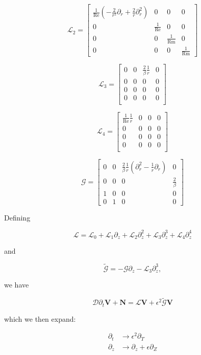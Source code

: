 \documentclass{paper}
\newcommand{\beq}{\begin{equation}}
\newcommand{\eeq}{\end{equation}}
\newcommand\reye{\mathrm{Re}}
\newcommand\reym{\mathrm{Rm}}
\begin{document}
\beq
\mathcal{L}_2 = \left[\begin{matrix}
\frac{1}{\reye}\left(-\frac{2}{r^2}\partial_r + \frac{2}{r}\partial_r^2\right) & 0 & 0 & 0 \\
0 & \frac{1}{\reye} & 0 & 0 \\
0 & 0 & \frac{1}{\reym} & 0 \\
0 & 0 & 0 & \frac{1}{\reym}
\end{matrix}\right]
\eeq

\beq
\mathcal{L}_3 = \left[\begin{matrix}
0 & 0 & \frac{2}{\beta} \frac{1}{r} & 0 \\
0 & 0 & 0 & 0 \\
0 & 0 & 0 & 0 \\
0 & 0 & 0 & 0 \\
\end{matrix}\right]
\eeq

\beq
\mathcal{L}_4 = \left[\begin{matrix}
\frac{1}{\reye}\frac{1}{r} & 0 & 0 & 0 \\
0 & 0 & 0 & 0 \\
0 & 0 & 0 & 0 \\
0 & 0 & 0 & 0 \\
\end{matrix}\right]
\eeq

\beq
\mathcal{G} = \left[\begin{matrix}
0 & 0 & \frac{2}{\beta} \frac{1}{r} \left(\partial_r^2 - \frac{1}{r}\partial_r\right) & 0 \\
0 & 0 & 0 & \frac{2}{\beta}\\
1 & 0 & 0 & 0\\
0 & 1 & 0 & 0
\end{matrix}\right] 
\eeq

Defining 

\beq
\mathcal{L}  = \mathcal{L}_0 + \mathcal{L}_1\partial_z + \mathcal{L}_2\partial_z^2 + \mathcal{L}_3\partial_z^3 + \mathcal{L}_4\partial_z^4
\eeq

and

\beq
\mathcal{\widetilde{G}} = - \mathcal{G} \partial_z - \mathcal{L}_3 \partial_z^3, 
\eeq

we have 

\beq
\mathcal{D} \partial_t \mathbf{V} + \mathbf{N} = \mathcal{L}\mathbf{V} + \epsilon^2 \mathcal{\widetilde{G}} \mathbf{V}
\eeq

which we then expand:

\beq
\begin{split}
 \partial_t & \rightarrow \epsilon^2 \partial_T \\
 \partial_z & \rightarrow \partial_z + \epsilon \partial_Z
\end{split}
\eeq
\end{document}
